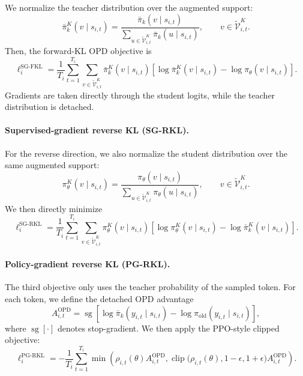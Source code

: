 We normalize the teacher distribution over the augmented support:
\begin{equation}
  \bar\pi_k^{K}(v\mid s_{i,t})
  =
  \frac{
    \bar\pi_k(v\mid s_{i,t})
  }{
    \sum_{u\in\widetilde{\mathcal V}_{i,t}^{K}}
    \bar\pi_k(u\mid s_{i,t})
  },
  \qquad
  v\in\widetilde{\mathcal V}_{i,t}^{K}.
\end{equation}
Then, the forward-KL OPD objective is
\begin{equation}
  \ell_i^{\mathrm{SG\text{-}FKL}}
  =
  \frac{1}{T_i}
  \sum_{t=1}^{T_i}
  \sum_{v\in\widetilde{\mathcal V}_{i,t}^{K}}
  \bar\pi_k^{K}(v\mid s_{i,t})
  \left[
    \log\bar\pi_k^{K}(v\mid s_{i,t})
    -
    \log\pi_\theta(v\mid s_{i,t})
  \right].
  \label{eq:opd-sg-fkl}
\end{equation}
Gradients are taken directly through the student logits, while the teacher
distribution is detached.

\paragraph{Supervised-gradient reverse KL (SG-RKL).}
For the reverse direction, we also normalize the student distribution over
the same augmented support:
\begin{equation}
  \pi_\theta^{K}(v\mid s_{i,t})
  =
  \frac{
    \pi_\theta(v\mid s_{i,t})
  }{
    \sum_{u\in\widetilde{\mathcal V}_{i,t}^{K}}
    \pi_\theta(u\mid s_{i,t})
  },
  \qquad
  v\in\widetilde{\mathcal V}_{i,t}^{K}.
\end{equation}
We then directly minimize
\begin{equation}
  \ell_i^{\mathrm{SG\text{-}RKL}}
  =
  \frac{1}{T_i}
  \sum_{t=1}^{T_i}
  \sum_{v\in\widetilde{\mathcal V}_{i,t}^{K}}
  \pi_\theta^{K}(v\mid s_{i,t})
  \left[
    \log\pi_\theta^{K}(v\mid s_{i,t})
    -
    \log\bar\pi_k^{K}(v\mid s_{i,t})
  \right].
  \label{eq:opd-sg-rkl}
\end{equation}


\paragraph{Policy-gradient reverse KL (PG-RKL).}
The third objective only uses the teacher probability of the sampled token.
For each token, we define the detached OPD advantage
\begin{equation}
  A_{i,t}^{\mathrm{OPD}}
  =
  \operatorname{sg}\left[
    \log\bar\pi_k(y_{i,t}\mid s_{i,t})
    -
    \log\pi_{\mathrm{old}}(y_{i,t}\mid s_{i,t})
  \right],
  \label{eq:opd-advantage}
\end{equation}
where $\operatorname{sg}[\cdot]$ denotes stop-gradient. We then apply the
PPO-style clipped objective:
\begin{equation}
  \ell_i^{\mathrm{PG\text{-}RKL}}
  =
  -\frac{1}{T_i}
  \sum_{t=1}^{T_i}
  \min\left(
    \rho_{i,t}(\theta)A_{i,t}^{\mathrm{OPD}},
    \operatorname{clip}
    \bigl(\rho_{i,t}(\theta),1-\epsilon,1+\epsilon\bigr)
    A_{i,t}^{\mathrm{OPD}}
  \right).
  \label{eq:opd-pg-rkl}
\end{equation}

